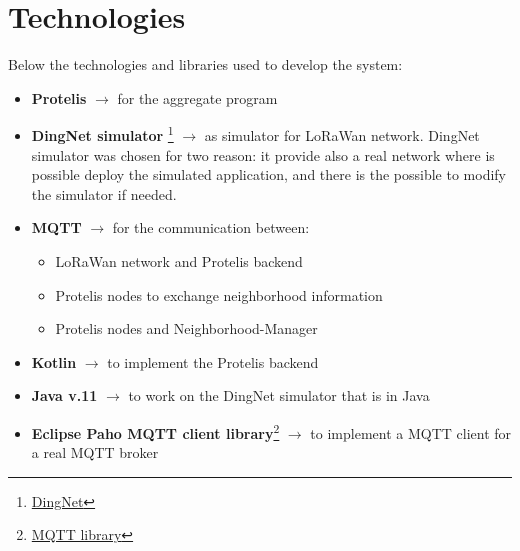 \chapter{Technologies}

Below the technologies and libraries used to develop the system:

\begin{itemize}
    \item \textbf{Protelis} $\rightarrow$ for the aggregate program
    \item \textbf{DingNet simulator} \footnote{\href{https://github.com/dimoibiehg/DingNet}{DingNet}} $\rightarrow$ as simulator for LoRaWan network. DingNet simulator was chosen for two reason: it provide also a real network where is possible deploy the simulated application, and there is the possible to modify the simulator if needed.  
    \item \textbf{MQTT} $\rightarrow$ for the communication between:
    \begin{itemize}
        \item LoRaWan network and Protelis backend
        \item Protelis nodes to exchange neighborhood information
        \item Protelis nodes and Neighborhood-Manager
    \end{itemize}
    \item \textbf{Kotlin} $\rightarrow$ to implement the Protelis backend
    \item \textbf{Java v.11} $\rightarrow$ to work on the DingNet simulator that is in Java
    \item \textbf{Eclipse Paho MQTT client library}\footnote{\href{https://github.com/eclipse/paho.mqtt.java}{MQTT library}} $\rightarrow$ to implement a MQTT client for a real MQTT broker
\end{itemize}


